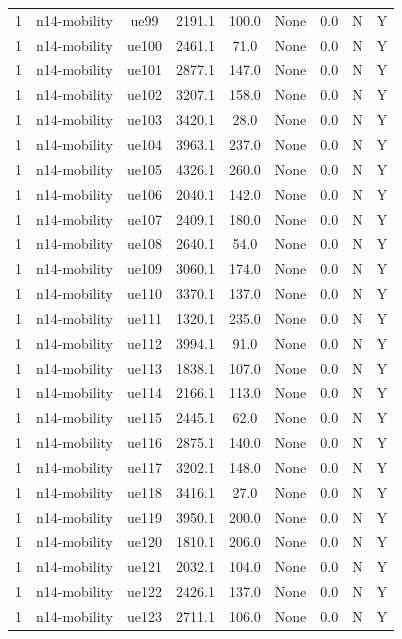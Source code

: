 \begin{table}[ht]
\begin{tabular}{|c|c|c|c|c|c|c|c|c|}
1 & n14-mobility & ue99 & 2191.1 & 100.0 & None & 0.0 & N & Y \\
1 & n14-mobility & ue100 & 2461.1 & 71.0 & None & 0.0 & N & Y \\
1 & n14-mobility & ue101 & 2877.1 & 147.0 & None & 0.0 & N & Y \\
1 & n14-mobility & ue102 & 3207.1 & 158.0 & None & 0.0 & N & Y \\
1 & n14-mobility & ue103 & 3420.1 & 28.0 & None & 0.0 & N & Y \\
1 & n14-mobility & ue104 & 3963.1 & 237.0 & None & 0.0 & N & Y \\
1 & n14-mobility & ue105 & 4326.1 & 260.0 & None & 0.0 & N & Y \\
1 & n14-mobility & ue106 & 2040.1 & 142.0 & None & 0.0 & N & Y \\
1 & n14-mobility & ue107 & 2409.1 & 180.0 & None & 0.0 & N & Y \\
1 & n14-mobility & ue108 & 2640.1 & 54.0 & None & 0.0 & N & Y \\
1 & n14-mobility & ue109 & 3060.1 & 174.0 & None & 0.0 & N & Y \\
1 & n14-mobility & ue110 & 3370.1 & 137.0 & None & 0.0 & N & Y \\
1 & n14-mobility & ue111 & 1320.1 & 235.0 & None & 0.0 & N & Y \\
1 & n14-mobility & ue112 & 3994.1 & 91.0 & None & 0.0 & N & Y \\
1 & n14-mobility & ue113 & 1838.1 & 107.0 & None & 0.0 & N & Y \\
1 & n14-mobility & ue114 & 2166.1 & 113.0 & None & 0.0 & N & Y \\
1 & n14-mobility & ue115 & 2445.1 & 62.0 & None & 0.0 & N & Y \\
1 & n14-mobility & ue116 & 2875.1 & 140.0 & None & 0.0 & N & Y \\
1 & n14-mobility & ue117 & 3202.1 & 148.0 & None & 0.0 & N & Y \\
1 & n14-mobility & ue118 & 3416.1 & 27.0 & None & 0.0 & N & Y \\
1 & n14-mobility & ue119 & 3950.1 & 200.0 & None & 0.0 & N & Y \\
1 & n14-mobility & ue120 & 1810.1 & 206.0 & None & 0.0 & N & Y \\
1 & n14-mobility & ue121 & 2032.1 & 104.0 & None & 0.0 & N & Y \\
1 & n14-mobility & ue122 & 2426.1 & 137.0 & None & 0.0 & N & Y \\
1 & n14-mobility & ue123 & 2711.1 & 106.0 & None & 0.0 & N & Y \\

\end{tabular}
\end{table}
